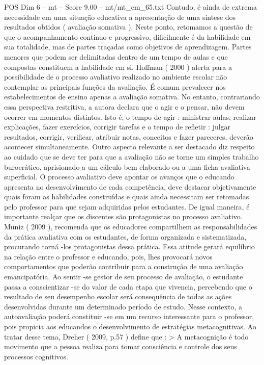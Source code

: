 \begin{textsample}{POS Dim 6 – mt – Score 9.00 – mt/mt\_em\_65.txt}
Contudo, é ainda de extrema necessidade em uma situação educativa a apresentação de uma síntese dos resultados obtidos ( avaliação somativa ).
Neste ponto, retomamos a questão de que o acompanhamento contínuo e progressivo, dificilmente é da habilidade em sua totalidade, mas de partes traçadas como objetivos de aprendizagem.
Partes menores que podem ser delimitadas dentro de um tempo de aulas e que compostas constituem a habilidade em si.
Hoffman ( 2000 ) alerta para a possibilidade de o processo avaliativo realizado no ambiente escolar não contemplar as principais funções da avaliação.
É comum prevalecer nos estabelecimentos de ensino apenas a avaliação somativa.
No entanto, contrariando essa perspectiva restritiva, a autora declara que o agir e o pensar, não devem ocorrer em momentos distintos.
Isto é, o tempo de agir : ministrar aulas, realizar explicações, fazer exercícios, corrigir tarefas e o tempo de refletir : julgar resultados, corrigir, verificar, atribuir notas, conceitos e fazer pareceres, deverão acontecer simultaneamente.
Outro aspecto relevante a ser destacado diz respeito ao cuidado que se deve ter para que a avaliação não se torne um simples trabalho burocrático, aprisionado a um cálculo bem elaborado ou a uma ficha avaliativa superficial.
O processo avaliativo deve apontar os avanços que o educando apresenta no desenvolvimento de cada competência, deve destacar objetivamente quais foram as habilidades construídas e quais ainda necessitam ser retomadas pelo professor para que sejam adquiridas pelos estudantes.
De igual maneira, é importante realçar que os discentes são protagonistas no processo avaliativo.
Muniz ( 2009 ), recomenda que os educadores compartilhem as responsabilidades da prática avaliativa com os estudantes, de forma organizada e sistematizada, procurando torná -los protagonistas dessa prática.
Essa atitude gerará equilíbrio na relação entre o professor e educando, pois, lhes provocará novos comportamentos que poderão contribuir para a construção de uma avaliação emancipatória.
Ao sentir -se gestor de seu processo de avaliação, o estudante passa a conscientizar -se do valor de cada etapa que vivencia, percebendo que o resultado de seu desempenho escolar será consequência de todas as ações desenvolvidas durante um determinado período de estudo.
Nesse contexto, a autoavaliação poderá constituir -se em um recurso interessante para o professor, pois propicia aos educandos o desenvolvimento de estratégias metacognitivas.
Ao tratar desse tema, Dreher ( 2009, p.57 ) define que : > A metacognição é todo movimento que a pessoa realiza para tomar consciência e controle dos seus processos cognitivos.

\end{textsample}
